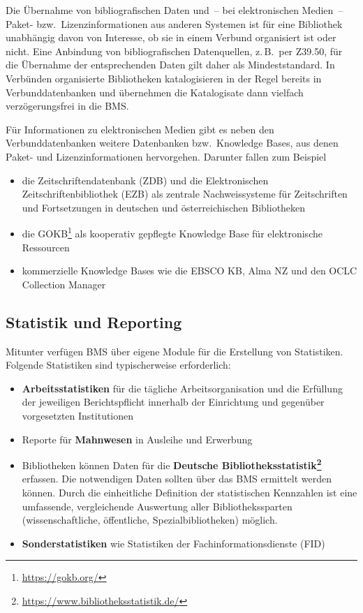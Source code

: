 \documentclass[
  11pt,
  letterpaper,
  DIV=11,
  twoside]{scrreprt}
\DeclareRobustCommand{\href}[2]{#2\footnote{\url{#1}}}
\begin{document}
Die Übernahme von bibliografischen Daten und~-- bei elektronischen
Medien~-- Paket- bzw.~Lizenzinformationen aus anderen Systemen ist für
eine Bibliothek unabhängig davon von Interesse, ob sie in einem Verbund
organisiert ist oder nicht. Eine Anbindung von bibliografischen
Datenquellen, z.\,B.~per Z39.50, für die Übernahme der entsprechenden
Daten gilt daher als Mindeststandard. In Verbünden organisierte
Bibliotheken katalogisieren in der Regel bereits in Verbunddatenbanken
und übernehmen die Katalogisate dann vielfach verzögerungsfrei in die
BMS.

Für Informationen zu elektronischen Medien gibt es neben den
Verbunddatenbanken weitere Datenbanken bzw.~Knowledge Bases, aus denen
Paket- und Lizenzinformationen hervorgehen. Darunter fallen zum Beispiel

\begin{itemize}
\item
  die Zeitschriftendatenbank (ZDB) und die Elektronischen
  Zeitschriftenbibliothek (EZB) als zentrale Nachweissysteme für
  Zeitschriften und Fortsetzungen in deutschen und österreichischen
  Bibliotheken
\item
  die \href{https://gokb.org/}{{GOKB}} als kooperativ gepflegte
  Knowledge Base für elektronische Ressourcen
\item
  kommerzielle Knowledge Bases wie die EBSCO KB, Alma NZ und den OCLC
  Collection Manager
\end{itemize}

\subsection{Statistik und Reporting}\label{statistik-und-reporting}

Mitunter verfügen BMS über eigene Module für die Erstellung von
Statistiken. Folgende Statistiken sind typischerweise erforderlich:

\begin{itemize}
\item
  \textbf{Arbeitsstatistiken} für die tägliche Arbeitsorganisation und
  die Erfüllung der jeweiligen Berichtspflicht innerhalb der Einrichtung
  und gegenüber vorgesetzten Institutionen
\item
  Reporte für \textbf{Mahnwesen} in Ausleihe und Erwerbung
\item
  Bibliotheken können Daten für die
  \textbf{\href{https://www.bibliotheksstatistik.de/}{Deutsche
  Bibliotheksstatistik}} erfassen. Die notwendigen Daten sollten über
  das BMS ermittelt werden können. Durch die einheitliche Definition der
  statistischen Kennzahlen ist eine umfassende, vergleichende Auswertung
  aller Bibliothekssparten (wissenschaftliche, öffentliche,
  Spezialbibliotheken) möglich.
\item
  \textbf{Sonderstatistiken} wie Statistiken der Fachinformationsdienste
  (FID)
\end{itemize}
\end{document}
